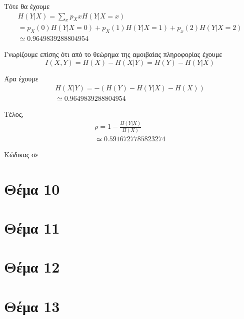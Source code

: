 \documentclass[12pt]{article}
\numberwithin{equation}{section}
\newcommand{\lt}{\latintext}
\begin{document}
	Τότε θα έχουμε
	\begin{gather*} 
		H(Y|X) = \sum_{x}p_{X}xH(Y|X=x) \\
		= p_{X}(0)H(Y|X=0) + p_{X}(1)H(Y|X=1) + p_{x}(2)H(Y|X=2) \\
		\simeq 0.9649839288804954
	\end{gather*}
	
	Γνωρίζουμε επίσης ότι από το θεώρημα της αμοιβαίας πληροφορίας έχουμε
	$$I(X,Y) = H(X) - H(X|Y) = H(Y) - H(Y|X)$$
	
	Άρα έχουμε
	\begin{gather*} 
		H(X|Y) = -(H(Y) - H(Y|X) - H(X)) \\
		\simeq 0.9649839288804954 
	\end{gather*}
	
	Τέλος,
	\begin{gather*} 
		ρ = 1 - \frac{H(Y|X)}{H(X)} \\
		\simeq 0.5916727785823274
	\end{gather*}
	
	Κώδικας σε \lt{python}
	{\lt{
			
	}}
	
	\section*{{\color{maroon}Θέμα 10}}
	
	\section*{{\color{maroon}Θέμα 11}}
	
	\section*{{\color{maroon}Θέμα 12}}
	
	\section*{{\color{maroon}Θέμα 13}}
	
\end{document}

